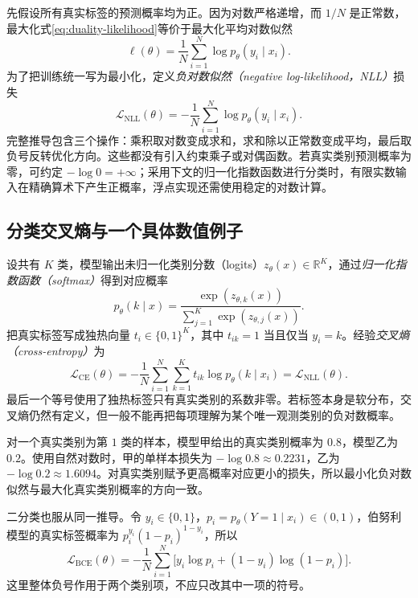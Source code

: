 \documentclass[UTF8,12pt,a4paper,fontset=fandol]{ctexart}
\begin{document}
先假设所有真实标签的预测概率均为正。因为对数严格递增，而 $1/N$ 是正常数，最大化式\eqref{eq:duality-likelihood}等价于最大化平均对数似然
\[
 \ell(\theta)=\frac1N\sum_{i=1}^N\log p_\theta(y_i\mid x_i).
\]
为了把训练统一写为最小化，定义\emph{负对数似然（negative log-likelihood，NLL）}损失
\begin{equation}
 \mathcal L_{\mathrm{NLL}}(\theta)
 =-\frac1N\sum_{i=1}^N\log p_\theta(y_i\mid x_i).
 \label{eq:duality-nll}
\end{equation}
完整推导包含三个操作：乘积取对数变成求和，求和除以正常数变成平均，最后取负号反转优化方向。这些都没有引入约束乘子或对偶函数。若真实类别预测概率为零，可约定 $-\log0=+\infty$；采用下文的归一化指数函数进行分类时，有限实数输入在精确算术下产生正概率，浮点实现还需使用稳定的对数计算。

\subsection{分类交叉熵与一个具体数值例子}

设共有 $K$ 类，模型输出未归一化类别分数（logits）$z_\theta(x)\in\mathbb R^K$，通过\emph{归一化指数函数（softmax）}得到对应概率
\[
 p_\theta(k\mid x)
 =\frac{\exp(z_{\theta,k}(x))}{\sum_{j=1}^K\exp(z_{\theta,j}(x))}.
\]
把真实标签写成独热向量 $t_i\in\{0,1\}^K$，其中 $t_{ik}=1$ 当且仅当 $y_i=k$。经验\emph{交叉熵（cross-entropy）}为
\begin{equation}
 \mathcal L_{\mathrm{CE}}(\theta)
 =-\frac1N\sum_{i=1}^N\sum_{k=1}^K t_{ik}\log p_\theta(k\mid x_i)
 =\mathcal L_{\mathrm{NLL}}(\theta).
 \label{eq:duality-cross-entropy}
\end{equation}
最后一个等号使用了独热标签只有真实类别的系数非零。若标签本身是软分布，交叉熵仍然有定义，但一般不能再把每项理解为某个唯一观测类别的负对数概率。

\begin{example}[为什么负号使正确预测得到较小损失]
对一个真实类别为第 $1$ 类的样本，模型甲给出的真实类别概率为 $0.8$，模型乙为 $0.2$。使用自然对数时，甲的单样本损失为 $-\log0.8\approx0.2231$，乙为 $-\log0.2\approx1.6094$。对真实类别赋予更高概率对应更小的损失，所以最小化负对数似然与最大化真实类别概率的方向一致。
\end{example}

二分类也服从同一推导。令 $y_i\in\{0,1\}$，$p_i=p_\theta(Y=1\mid x_i)\in(0,1)$，伯努利模型的真实标签概率为 $p_i^{y_i}(1-p_i)^{1-y_i}$，所以
\[
 \mathcal L_{\mathrm{BCE}}(\theta)
 =-\frac1N\sum_{i=1}^N
 \bigl[y_i\log p_i+(1-y_i)\log(1-p_i)\bigr].
\]
这里整体负号作用于两个类别项，不应只改其中一项的符号。
\end{document}
